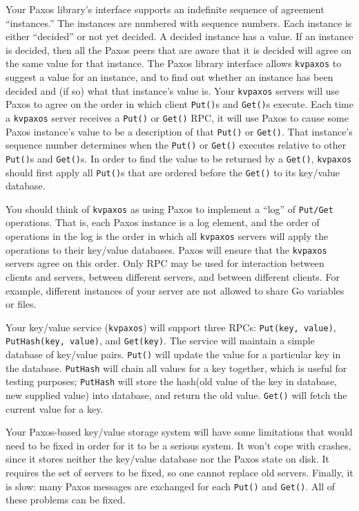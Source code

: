 \documentclass{article}
\newcommand{\code}{\texttt}
\begin{document}
Your Paxos library's interface supports an indefinite sequence of
agreement ``instances.'' The instances are numbered with sequence
numbers. Each instance is either ``decided'' or not yet decided. A
decided instance has a value. If an instance is decided, then all the
Paxos peers that are aware that it is decided will agree on the same
value for that instance. The Paxos library interface allows \code{kvpaxos} to
suggest a value for an instance, and to find out whether an instance has
been decided and (if so) what that instance's value is.
Your \code{kvpaxos} servers will use Paxos to agree on the order in which
client \code{Put()}s and \code{Get()}s execute. Each time a \code{kvpaxos} server receives a
\code{Put()} or \code{Get()} RPC, it will use Paxos to cause some Paxos instance's
value to be a description of that \code{Put()} or \code{Get()}. That instance's sequence
number determines when the \code{Put()} or \code{Get()} executes relative to other
\code{Put()}s and \code{Get()}s. In order to find the value to be returned by a \code{Get()},
\code{kvpaxos} should first apply all \code{Put()}s that are ordered before the \code{Get()} to
its key/value database.

You should think of \code{kvpaxos} as using Paxos to implement a ``log'' of
\code{Put/Get} operations. That is, each Paxos instance is a log element, and
the order of operations in the log is the order in which all \code{kvpaxos}
servers will apply the operations to their key/value databases. Paxos
will ensure that the \code{kvpaxos} servers agree on this order.
Only RPC may be used for interaction between clients and servers,
between different servers, and between different clients. For example,
different instances of your server are not allowed to share Go variables
or files.

Your key/value service (\code{kvpaxos}) will support three RPCs: \code{Put(key, value)}, \code{PutHash(key, value)}, and \code{Get(key)}. The service will maintain a
simple database of key/value pairs. \code{Put()} will update the value for a
particular key in the database. \code{PutHash} will chain all values for a key
together, which is useful for testing purposes; \code{PutHash} will store the
hash(old value of the key in database, new supplied value) into
database, and return the old value. \code{Get()} will fetch the current value for
a key.

Your Paxos-based key/value storage system will have some limitations
that would need to be fixed in order for it to be a serious system. It won't
cope with crashes, since it stores neither the key/value database nor
the Paxos state on disk. It requires the set of servers to be fixed, so one
cannot replace old servers. Finally, it is slow: many Paxos messages
are exchanged for each \code{Put()} and \code{Get()}. All of these problems can be
fixed.
\end{document}
